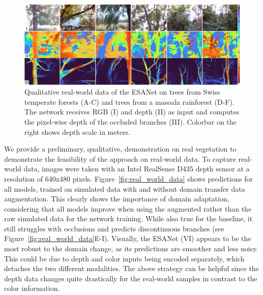 \begin{figure}[!hpt]
\centering
\includegraphics[width=\linewidth]{chapters/papers/OBR/figures/fig-5-qualitative-real/fig-5-qualitative-real.pdf}
\caption{Qualitative real-world data of the ESANet on trees from Swiss temperate forests (A-C) and trees from a masoala rainforest (D-F). The network receives RGB (I) and depth (II) as input and computes the pixel-wise depth of the occluded branches (III). Colorbar on the right shows depth scale in meters.}
\label{fig-5-qualitative-real}
\vspace{\figurevspacebelow}
\end{figure}




We provide a preliminary, qualitative, demonstration on real vegetation to demonstrate the feasibility of the approach on real-world data. To capture real-world data, images were taken with an Intel RealSense D435 depth sensor at a resolution of 640x480 pixels. Figure~\ref{fig:real_world_data} shows predictions for all models, trained on simulated data with and without domain transfer data augmentation. This clearly shows the importance of domain adaptation, considering that all models improve when using the augmented rather than the raw simulated data for the network training. While also true for the baseline, it still struggles with occlusions and predicts discontinuous branches (see Figure~\ref{fig:real_world_data}E-I). Visually, the ESANet (VI) appears to be the most robust to the domain change, as its predictions are smoother and less noisy. This could be due to depth and color inputs being encoded separately, which detaches the two different modalities. The above strategy can be helpful since the depth data changes quite drastically for the real-world samples in contrast to the color information. 

